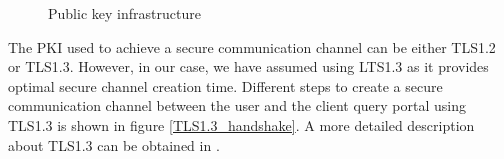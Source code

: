 \begin{figure}[!ht]
    \caption{Public key infrastructure}
    \label{fig_public_key_infrastructure}
\end{figure}



The PKI used to achieve a secure communication channel can be either TLS1.2 or TLS1.3. However, in our case, we have assumed using LTS1.3 as it provides optimal secure channel creation time. Different steps to create a secure communication channel between the user and the client query portal using TLS1.3 is shown in figure \ref{TLS1.3_handshake}. A more detailed description about TLS1.3 can be obtained in \cite{TLS13}.




